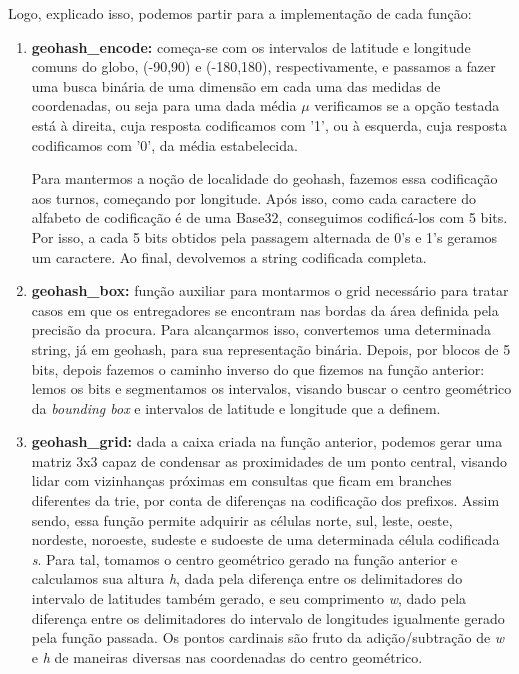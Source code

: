 \documentclass[12pt,a4paper]{article}
\begin{document}
Logo, explicado isso, podemos partir para a implementação de cada função:
\begin{enumerate}
  \item \textbf{geohash\_encode:} começa-se com os intervalos de latitude e longitude comuns do globo, (-90,90) e (-180,180), respectivamente,
    e passamos a fazer uma busca binária de uma dimensão em cada uma das medidas de coordenadas, ou seja para uma dada média $\mu$ verificamos se 
    a opção testada está à direita, cuja resposta codificamos com '1', ou à esquerda, cuja resposta codificamos com '0', da média estabelecida.
    
    Para mantermos a noção de localidade do geohash, fazemos essa codificação aos turnos, começando por longitude. Após isso, como cada caractere 
    do alfabeto de codificação é de uma Base32, conseguimos codificá-los com 5 bits. Por isso, a cada 5 bits obtidos pela passagem alternada de 0's e 1's 
    geramos um caractere. Ao final, devolvemos a string codificada completa.
  \item \textbf{geohash\_box:} função auxiliar para montarmos o grid necessário para tratar casos em que os entregadores se encontram nas bordas da área 
    definida pela precisão da procura. Para alcançarmos isso, convertemos uma determinada string, já em geohash, para sua representação binária. Depois,
    por blocos de 5 bits, depois fazemos o caminho inverso do que fizemos na função anterior: lemos os bits e segmentamos os intervalos, visando buscar 
    o centro geométrico da \textit{bounding box} e intervalos de latitude e longitude que a definem.
  \item \textbf{geohash\_grid:} dada a caixa criada na função anterior, podemos gerar uma matriz 3x3 capaz de condensar as proximidades de um ponto central, 
    visando lidar com vizinhanças próximas em consultas que ficam em branches diferentes da trie, por conta de diferenças na codificação dos prefixos. Assim sendo,
    essa função permite adquirir as células norte, sul, leste, oeste, nordeste, noroeste, sudeste e sudoeste de uma determinada célula codificada \textit{s}.
    Para tal, tomamos o centro geométrico gerado na função anterior e calculamos sua altura \textit{h}, dada pela diferença entre os delimitadores do intervalo 
    de latitudes também gerado, e seu comprimento \textit{w}, dado pela diferença entre os delimitadores do intervalo de longitudes igualmente gerado pela função passada.
    Os pontos cardinais são fruto da adição/subtração de \textit{w} e \textit{h} de maneiras diversas nas coordenadas do centro geométrico. 
\end{enumerate}
\end{document}
